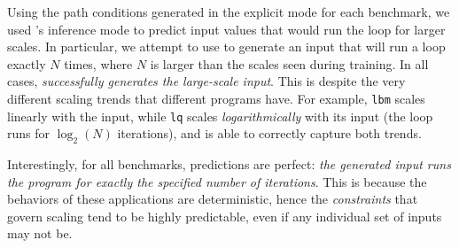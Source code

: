 Using the path conditions generated in the explicit mode for each benchmark, we used \lancet's inference mode to predict input values that would run the loop for larger scales. In particular, we attempt to use \lancet to generate an input that will run a loop exactly $N$ times, where $N$ is larger than the scales seen during training. In all cases, {\em \lancet successfully generates the large-scale input}. This is despite the very different scaling trends that different programs have. For example, {\tt lbm} scales linearly with the input, while {\tt lq} scales {\em logarithmically} with its input (the loop runs for $\log_2(N)$ iterations), and \lancet is able to correctly capture both trends.

Interestingly, for all benchmarks, \lancet predictions are  perfect: {\em the generated input runs the program for exactly the specified number of iterations}. This is because the behaviors of these applications are deterministic, hence the {\em constraints} that govern scaling tend to be highly predictable, even if any individual set of inputs may not be.



 


